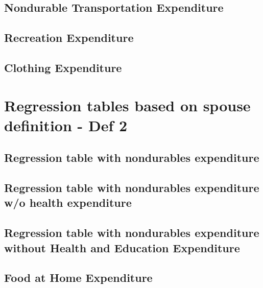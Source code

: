\documentclass[a4paper,landscape]{article}
\begin{document}
\subsection{Nondurable Transportation Expenditure}

\clearpage

\subsection{Recreation Expenditure}

\clearpage

\subsection{Clothing Expenditure}

\clearpage


\section{Regression tables based on spouse definition - Def 2}

\subsection{Regression table with nondurables expenditure}

\clearpage

\subsection{Regression table with nondurables expenditure w/o health expenditure} 

\clearpage

\subsection{Regression table with nondurables expenditure without Health and Education Expenditure}

\clearpage


\subsection{Food at Home Expenditure}

\clearpage
\end{document}
